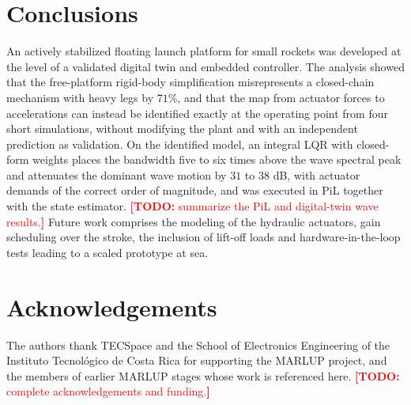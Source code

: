 \documentclass[]{IAC_style}
\newcommand{\todo}[1]{\textcolor{red}{\textbf{[TODO:} #1\textbf{]}}}
\begin{document}
\section{Conclusions}
\label{sec:concl}
An actively stabilized floating launch platform for small rockets was developed at the level of a validated digital twin and embedded controller. The analysis showed that the free-platform rigid-body simplification misrepresents a closed-chain mechanism with heavy legs by $71\%$, and that the map from actuator forces to accelerations can instead be identified exactly at the operating point from four short simulations, without modifying the plant and with an independent prediction as validation. On the identified model, an integral LQR with closed-form weights places the bandwidth five to six times above the wave spectral peak and attenuates the dominant wave motion by $31$ to $38$ dB, with actuator demands of the correct order of magnitude, and was executed in PiL together with the state estimator. \todo{summarize the PiL and digital-twin wave results.} Future work comprises the modeling of the hydraulic actuators, gain scheduling over the stroke, the inclusion of lift-off loads and hardware-in-the-loop tests leading to a scaled prototype at sea.

\section*{Acknowledgements}
The authors thank TECSpace and the School of Electronics Engineering of the Instituto Tecnol\'ogico de Costa Rica for supporting the MARLUP project, and the members of earlier MARLUP stages whose work is referenced here. \todo{complete acknowledgements and funding.}


\end{document}

